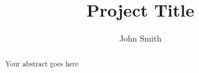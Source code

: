 \documentclass[a4paper, twoside]{report}
\title{Project Title}
\author{John Smith}
\begin{document}


\begin{abstract}
Your abstract goes here
\end{abstract}

\renewcommand{\abstractname}{Acknowledgements}
\begin{abstract}
\end{abstract}

\tableofcontents
\listoffigures
\listoftables










\end{document}
